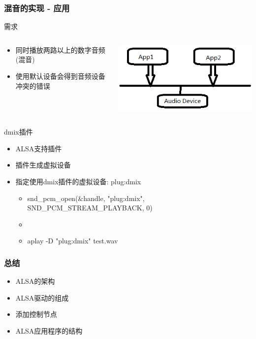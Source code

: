 \documentclass[CJK]{beamer}
\begin{document}
\begin{frame}[t]
    \frametitle{混音的实现 - 应用}
    \begin{alertblock}{需求}
        \begin{columns}
            \begin{column}{0.7\textwidth}
                \begin{itemize}
                    \item 同时播放两路以上的数字音频(混音)
                    \item 使用默认设备会得到音频设备冲突的错误
                \end{itemize}
            \end{column}
            \begin{column}{0.3\textwidth}
                \includegraphics[height=40bp]{"mix.png"}
            \end{column}
        \end{columns}
    \end{alertblock}
    \pause
    \begin{exampleblock}{dmix插件}
        \begin{itemize}
            \item ALSA支持插件
            \item 插件生成虚拟设备
            \item 指定使用dmix插件的虚拟设备: plug:dmix
            \begin{itemize}
                \item snd\_pcm\_open(\&handle, "plug:dmix", SND\_PCM\_STREAM\_PLAYBACK, 0)
                \item 
                \item aplay -D "plug:dmix" test.wav
            \end{itemize}
        \end{itemize}
    \end{exampleblock}
\end{frame}

\begin{frame}
    \frametitle{总结}
    \begin{itemize}
        \item ALSA的架构
        \item ALSA驱动的组成
        \item 添加控制节点 
        \item ALSA应用程序的结构
    \end{itemize}
\end{frame}
\end{document}
